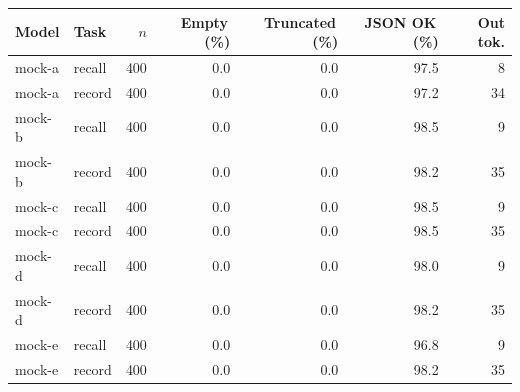 \begin{tabular}{llrrrrr}
\toprule
Model & Task & $n$ & Empty\,(\%) & Truncated\,(\%) & JSON OK\,(\%) & Out tok. \\
\midrule
mock-a & recall & 400 & 0.0 & 0.0 & 97.5 & 8 \\
mock-a & record & 400 & 0.0 & 0.0 & 97.2 & 34 \\
mock-b & recall & 400 & 0.0 & 0.0 & 98.5 & 9 \\
mock-b & record & 400 & 0.0 & 0.0 & 98.2 & 35 \\
mock-c & recall & 400 & 0.0 & 0.0 & 98.5 & 9 \\
mock-c & record & 400 & 0.0 & 0.0 & 98.5 & 35 \\
mock-d & recall & 400 & 0.0 & 0.0 & 98.0 & 9 \\
mock-d & record & 400 & 0.0 & 0.0 & 98.2 & 35 \\
mock-e & recall & 400 & 0.0 & 0.0 & 96.8 & 9 \\
mock-e & record & 400 & 0.0 & 0.0 & 98.2 & 35 \\
\bottomrule
\end{tabular}
